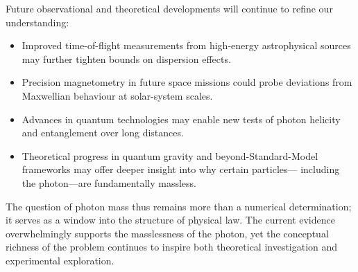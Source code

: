 Future observational and theoretical developments will continue to 
refine our understanding:

\begin{itemize}
	\item Improved time-of-flight measurements from high-energy 
	astrophysical sources may further tighten bounds on dispersion effects.
	\item Precision magnetometry in future space missions could probe 
	deviations from Maxwellian behaviour at solar-system scales.
	\item Advances in quantum technologies may enable new tests of photon 
	helicity and entanglement over long distances.
	\item Theoretical progress in quantum gravity and beyond-Standard-Model 
	frameworks may offer deeper insight into why certain particles—
	including the photon—are fundamentally massless.
\end{itemize}

The question of photon mass thus remains more than a numerical 
determination; it serves as a window into the structure of physical law.  
The current evidence overwhelmingly supports the masslessness of the 
photon, yet the conceptual richness of the problem continues to inspire 
both theoretical investigation and experimental exploration.
